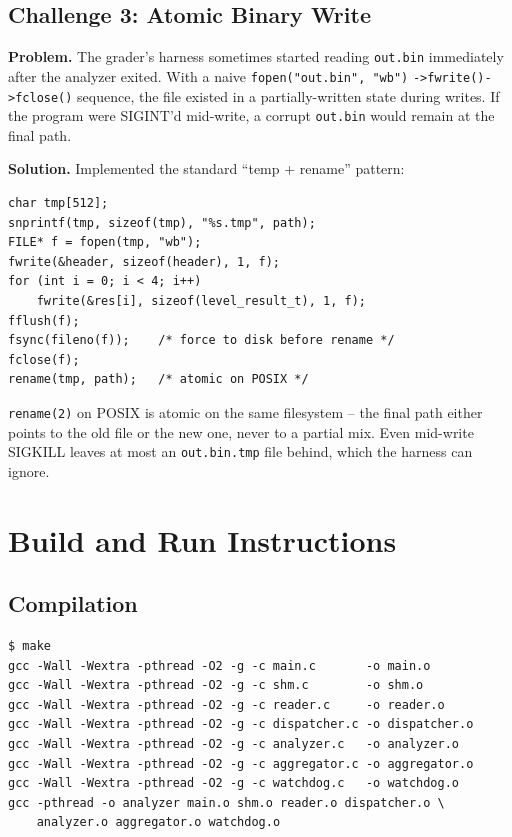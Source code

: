 \documentclass[11pt,a4paper]{article}
\newcommand{\code}[1]{\texttt{\small #1}}
\begin{document}
\subsection{Challenge 3: Atomic Binary Write}

\textbf{Problem.} The grader's harness sometimes started reading
\code{out.bin} immediately after the analyzer exited. With a naive
\code{fopen("out.bin", "wb")} \code{->fwrite()->fclose()} sequence, the
file existed in a partially-written state during writes. If the
program were SIGINT'd mid-write, a corrupt \code{out.bin} would remain
at the final path.

\textbf{Solution.} Implemented the standard ``temp + rename'' pattern:

\begin{lstlisting}[style=Cstyle]
char tmp[512];
snprintf(tmp, sizeof(tmp), "%s.tmp", path);
FILE* f = fopen(tmp, "wb");
fwrite(&header, sizeof(header), 1, f);
for (int i = 0; i < 4; i++)
    fwrite(&res[i], sizeof(level_result_t), 1, f);
fflush(f);
fsync(fileno(f));    /* force to disk before rename */
fclose(f);
rename(tmp, path);   /* atomic on POSIX */
\end{lstlisting}

\code{rename(2)} on POSIX is atomic on the same filesystem -- the
final path either points to the old file or the new one, never to a
partial mix. Even mid-write SIGKILL leaves at most an
\code{out.bin.tmp} file behind, which the harness can ignore.

\section{Build and Run Instructions}

\subsection{Compilation}

\begin{lstlisting}[style=Bashstyle]
$ make
gcc -Wall -Wextra -pthread -O2 -g -c main.c       -o main.o
gcc -Wall -Wextra -pthread -O2 -g -c shm.c        -o shm.o
gcc -Wall -Wextra -pthread -O2 -g -c reader.c     -o reader.o
gcc -Wall -Wextra -pthread -O2 -g -c dispatcher.c -o dispatcher.o
gcc -Wall -Wextra -pthread -O2 -g -c analyzer.c   -o analyzer.o
gcc -Wall -Wextra -pthread -O2 -g -c aggregator.c -o aggregator.o
gcc -Wall -Wextra -pthread -O2 -g -c watchdog.c   -o watchdog.o
gcc -pthread -o analyzer main.o shm.o reader.o dispatcher.o \
    analyzer.o aggregator.o watchdog.o
\end{lstlisting}
\end{document}
